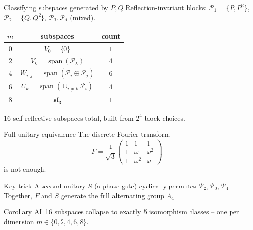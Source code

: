 \documentclass[aspectratio=169]{beamer}
\begin{document}
\begin{frame}{Classifying subspaces generated by $P, Q$}
    Reflection-invariant blocks: $\mathcal{P}_1 = \{P,P^2\}$,
    $\mathcal{P}_2 = \{Q,Q^2\}$, $\mathcal{P}_3, \mathcal{P}_4$ (mixed).

    \begin{center}
        \begin{tabular}{ccc}
            \toprule
            $m$ & subspaces & count \\
            \midrule
            $0$ & $V_0 = \{0\}$ & $1$ \\
            $2$ & $V_k = \operatorname{span}(\mathcal{P}_k)$ & $4$ \\
            $4$ & $W_{i,j} = \operatorname{span}(\mathcal{P}_i \oplus
            \mathcal{P}_j)$ & $6$ \\
            $6$ & $U_k = \operatorname{span}(\cup_{i \neq k}
            \mathcal{P}_i)$ & $4$ \\
            $8$ & $\mathfrak{sl}_3$ & $1$ \\
            \bottomrule
        \end{tabular}
    \end{center}
    \vspace{0.3em}
    $16$ self-reflective subspaces total, built from $2^4$ block choices.
\end{frame}

\begin{frame}{Full unitary equivalence}
    The discrete Fourier transform
    \[
        F = \frac{1}{\sqrt{3}}
        \begin{pmatrix} 1 & 1 & 1 \\ 1 & \omega & \omega^2 \\ 1 &
            \omega^2 & \omega
        \end{pmatrix}
    \]
    is not enough.
    \vspace{0.3em}
    \begin{block}{Key trick}
        A second unitary $S$ (a phase gate) cyclically permutes
        $\mathcal{P}_2, \mathcal{P}_3, \mathcal{P}_4$.
        Together, $F$ and $S$ generate the full alternating group $A_4$
    \end{block}

    \vspace{0.3em}
    \begin{block}{Corollary}
        All 16 subspaces collapse to exactly \textbf{5} isomorphism classes
        -- one per dimension $m \in \{0,2,4,6,8\}$.
    \end{block}
\end{frame}
\end{document}
